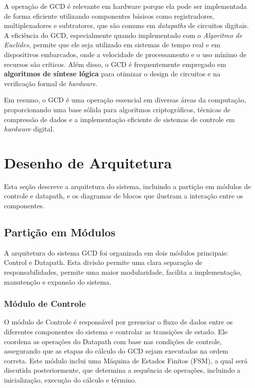 \documentclass[a4paper,11pt]{article} %
\begin{document}
A operação de GCD é relevante em hardware porque ela pode ser implementada de forma eficiente utilizando componentes básicos como registradores, multiplexadores e subtratores, que são comuns em \textit{datapaths} de circuitos digitais. A eficiência do GCD, especialmente quando implementado com o \textit{Algoritmo de Euclides}, permite que ele seja utilizado em sistemas de tempo real e em dispositivos embarcados, onde a velocidade de processamento e o uso mínimo de recursos são críticos. Além disso, o GCD é frequentemente empregado em \textbf{algoritmos de síntese lógica} para otimizar o design de circuitos e na verificação formal de \textit{hardware}.

Em resumo, o GCD é uma operação essencial em diversas áreas da computação, proporcionando uma base sólida para algoritmos criptográficos, técnicas de compressão de dados e a implementação eficiente de sistemas de controle em \textit{hardware} digital.


\section{Desenho de Arquitetura}
Esta seção descreve a arquitetura do sistema,
incluindo a partição em módulos de controle e datapath,
e os diagramas de blocos que ilustram a interação entre os componentes.

\subsection{Partição em Módulos}
A arquitetura do sistema GCD foi organizada em dois módulos principais: Control e Datapath.
Esta divisão permite uma clara separação de responsabilidades, permite
uma maior modularidade,
facilita a implementação, manutenção e expansão do sistema.

\subsubsection{Módulo de Controle}
O módulo de Controle é responsável por gerenciar o fluxo de dados
entre os diferentes componentes do sistema e controlar as transições de estado.
Ele coordena as operações do Datapath com base nas condições de controle,
assegurando que as etapas do cálculo do GCD sejam executadas na ordem correta.
Este módulo inclui uma Máquina de Estados Finitos (FSM), a qual será discutida posteriormente,
que determina a sequência de operações, incluindo a inicialização,
execução do cálculo e término.
\end{document}
